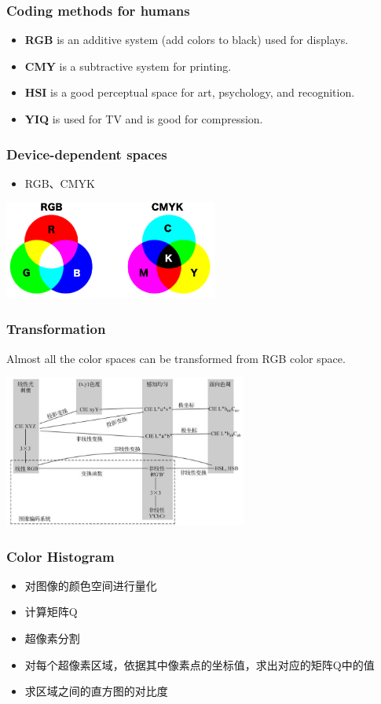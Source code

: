 \documentclass[notheorems,serif,table,compress]{beamer}  %
\begin{document}
\begin{frame}
\frametitle{Coding methods for humans}
\begin{itemize}
\item \textbf{RGB} is an additive system (add colors to black) used for displays.
\item \textbf{CMY} is a subtractive system for printing.
\item \textbf{HSI} is a good perceptual space for art, psychology, and recognition.
\item \textbf{YIQ} is used for TV and is good for compression. 
\end{itemize}
\end{frame}


\begin{frame}
\frametitle{Device-dependent spaces}
\begin{itemize}
\item RGB、CMYK
\end{itemize}

\centering\includegraphics[width=7cm]{RGB_CMYK.png}
\end{frame}


\begin{frame}
\frametitle{Transformation}
Almost all the color spaces can be transformed from RGB color space.

\centering\includegraphics[width=8cm]{ColorSpaceTransform}
\end{frame}


\begin{frame}
\frametitle{Color Histogram}
\begin{itemize}
\item 对图像的颜色空间进行量化
\item 计算矩阵Q
\item 超像素分割
\item 对每个超像素区域，依据其中像素点的坐标值，求出对应的矩阵Q中的值
\item 求区域之间的直方图的对比度
\end{itemize}
\end{frame}
\end{document}
